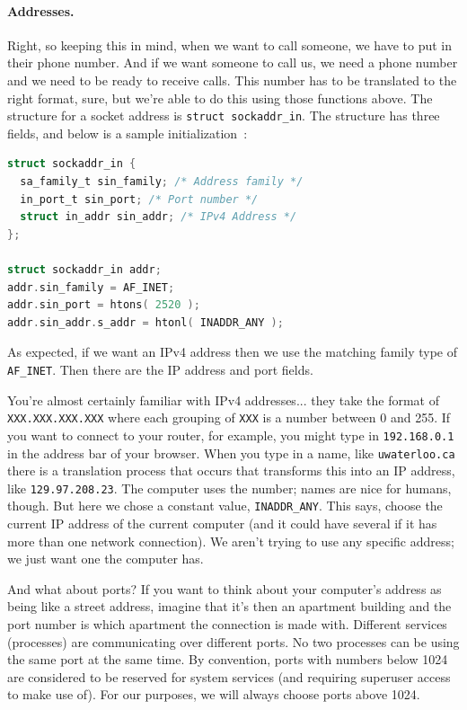 \paragraph{Addresses.} Right, so keeping this in mind, when we want to call someone, we have to put in their phone number. And if we want someone to call us, we need a phone number and we need to be ready to receive calls. This number has to be translated to the right format, sure, but we're able to do this using those functions above. The structure for a socket address is \texttt{struct sockaddr\_in}. The structure has three fields, and below is a sample initialization~\cite{apunix}:

\begin{lstlisting}[language=C]
struct sockaddr_in {
  sa_family_t sin_family; /* Address family */
  in_port_t sin_port; /* Port number */
  struct in_addr sin_addr; /* IPv4 Address */
};

struct sockaddr_in addr;
addr.sin_family = AF_INET;
addr.sin_port = htons( 2520 );
addr.sin_addr.s_addr = htonl( INADDR_ANY );
\end{lstlisting}

As expected, if we want an IPv4 address then we use the matching family type of \texttt{AF\_INET}. Then there are the IP address and port fields.

You're almost certainly familiar with IPv4 addresses... they take the format of \texttt{XXX.XXX.XXX.XXX} where each grouping of \texttt{XXX} is a number between 0 and 255. If you want to connect to your router, for example, you might type in \texttt{192.168.0.1} in the address bar of your browser. When you type in a name, like \texttt{uwaterloo.ca} there is a translation process that occurs that transforms this into an IP address, like \texttt{129.97.208.23}. The computer uses the number; names are nice for humans, though. But here we chose a constant value, \texttt{INADDR\_ANY}. This says, choose the current IP address of the current computer (and it could have several if it has more than one network connection). We aren't trying to use any specific address; we just want one the computer has.

And what about ports? If you want to think about your computer's address as being like a street address, imagine that it's then an apartment building and the port number is which apartment the connection is made with. Different services (processes) are communicating over different ports. No two processes can be using the same port at the same time. By convention, ports with numbers below 1024 are considered to be reserved for system services (and requiring superuser access to make use of). For our purposes, we will always choose ports above 1024.

